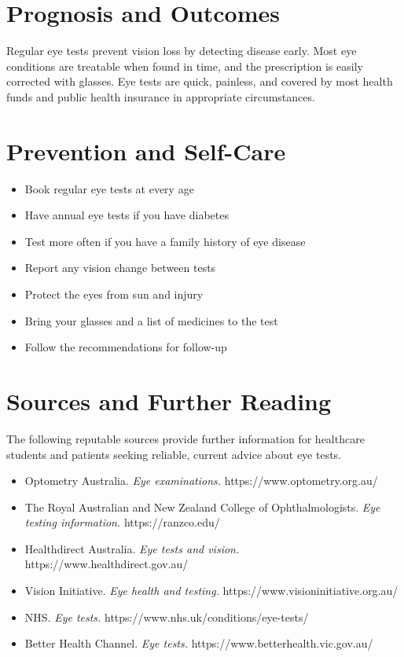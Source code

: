 \section*{Prognosis and Outcomes}
Regular eye tests prevent vision loss by detecting disease early. Most eye conditions are treatable when found in time, and the prescription is easily corrected with glasses. Eye tests are quick, painless, and covered by most health funds and public health insurance in appropriate circumstances.

\section*{Prevention and Self-Care}
\begin{itemize}
    \item Book regular eye tests at every age
    \item Have annual eye tests if you have diabetes
    \item Test more often if you have a family history of eye disease
    \item Report any vision change between tests
    \item Protect the eyes from sun and injury
    \item Bring your glasses and a list of medicines to the test
    \item Follow the recommendations for follow-up
\end{itemize}

\section*{Sources and Further Reading}
The following reputable sources provide further information for healthcare students and patients seeking reliable, current advice about eye tests.
\begin{itemize}
    \item Optometry Australia. \textit{Eye examinations.} https://www.optometry.org.au/
    \item The Royal Australian and New Zealand College of Ophthalmologists. \textit{Eye testing information.} https://ranzco.edu/
    \item Healthdirect Australia. \textit{Eye tests and vision.} https://www.healthdirect.gov.au/
    \item Vision Initiative. \textit{Eye health and testing.} https://www.visioninitiative.org.au/
    \item NHS. \textit{Eye tests.} https://www.nhs.uk/conditions/eye-tests/
    \item Better Health Channel. \textit{Eye tests.} https://www.betterhealth.vic.gov.au/
\end{itemize}
